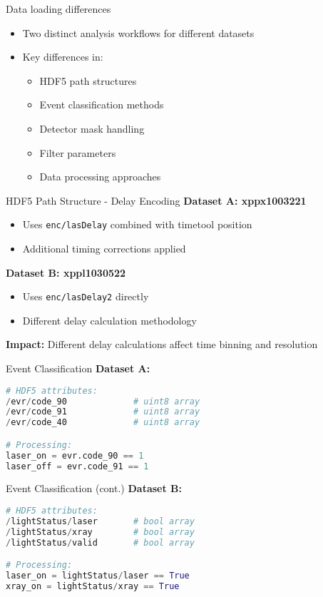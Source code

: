 \documentclass{beamer}
\begin{document}
\begin{frame}{Data loading differences}
\begin{itemize}
\item Two distinct analysis workflows for different datasets
\item Key differences in:
    \begin{itemize}
    \item HDF5 path structures
    \item Event classification methods
    \item Detector mask handling
    \item Filter parameters
    \item Data processing approaches
    \end{itemize}
\end{itemize}
\end{frame}

\begin{frame}{HDF5 Path Structure - Delay Encoding}
\textbf{Dataset A: xppx1003221}
\begin{itemize}
\item Uses \texttt{enc/lasDelay} combined with timetool position
\item Additional timing corrections applied
\end{itemize}

\textbf{Dataset B: xppl1030522}
\begin{itemize}
\item Uses \texttt{enc/lasDelay2} directly
\item Different delay calculation methodology
\end{itemize}

\textbf{Impact:} Different delay calculations affect time binning and resolution
\end{frame}

\begin{frame}[fragile]{Event Classification}
\textbf{Dataset A:}
\begin{lstlisting}[language=Python]
# HDF5 attributes:
/evr/code_90             # uint8 array
/evr/code_91             # uint8 array
/evr/code_40             # uint8 array

# Processing:
laser_on = evr.code_90 == 1
laser_off = evr.code_91 == 1
\end{lstlisting}
\end{frame}

\begin{frame}[fragile]{Event Classification (cont.)}
\textbf{Dataset B:}
\begin{lstlisting}[language=Python]
# HDF5 attributes:
/lightStatus/laser       # bool array
/lightStatus/xray        # bool array
/lightStatus/valid       # bool array

# Processing:
laser_on = lightStatus/laser == True
xray_on = lightStatus/xray == True
\end{lstlisting}
\end{frame}
\end{document}
